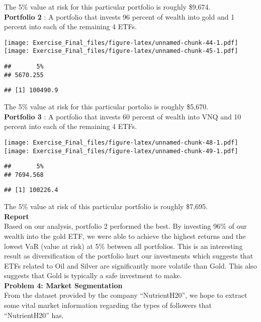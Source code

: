 \documentclass[
]{article}
\begin{document}
The 5\% value at risk for this particular portfolio is roughly
\$9,674.\\

\textbf{Portfolio 2} : A portfolio that invests 96 percent of wealth
into gold and 1 percent into each of the remaining 4 ETFs.

\texttt{[image: Exercise\_Final\_files/figure-latex/unnamed-chunk-44-1.pdf]}
\texttt{[image: Exercise\_Final\_files/figure-latex/unnamed-chunk-45-1.pdf]}

\begin{verbatim}
##       5% 
## 5670.255
\end{verbatim}

\begin{verbatim}
## [1] 100490.9
\end{verbatim}

The 5\% value at risk for this particular portolio is roughly \$5,670.\\

\textbf{Portfolio 3} : A portfolio that invests 60 percent of wealth
into VNQ and 10 percent into each of the remaining 4 ETFs.

\texttt{[image: Exercise\_Final\_files/figure-latex/unnamed-chunk-48-1.pdf]}
\texttt{[image: Exercise\_Final\_files/figure-latex/unnamed-chunk-49-1.pdf]}

\begin{verbatim}
##       5% 
## 7694.568
\end{verbatim}

\begin{verbatim}
## [1] 100226.4
\end{verbatim}

The 5\% value at risk of this particular portfolio is roughly \$7,695.\\

\textbf{Report}\\
Based on our analysis, portfolio 2 performed the best. By investing 96\%
of our wealth into the gold ETF, we were able to achieve the highest
returns and the lowest VaR (value at risk) at 5\% between all
portfolios. This is an interesting result as diversification of the
portfolio hurt our investments which suggests that ETFs related to Oil
and Silver are significantly more volatile than Gold. This also suggests
that Gold is typically a safe investment to make.\\

\textbf{Problem 4: Market Segmentation}\\
From the dataset provided by the company ``NutrientH20'', we hope to
extract some vital market information regarding the types of followers
that ``NutrientH20'' has.
\end{document}
